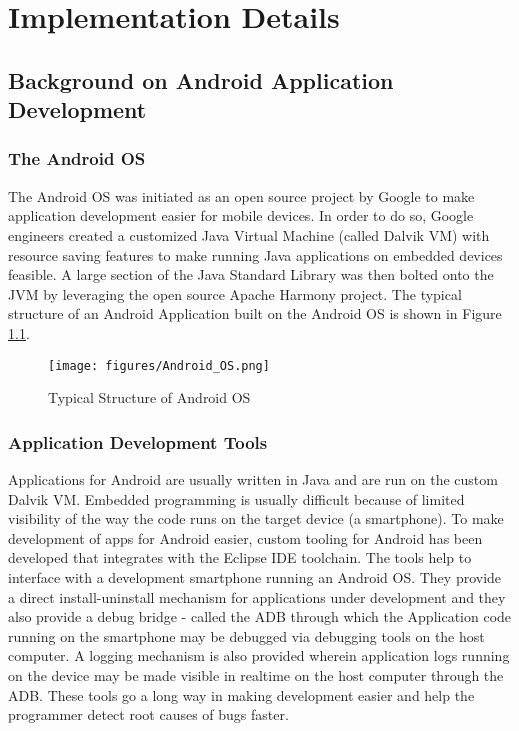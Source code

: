 \chapter{Implementation Details\label{chap:implementation_details}}

\section{Background on Android Application Development}

\subsection{The Android OS}

The Android OS was initiated as an open source project by Google  
to make application development easier for mobile devices. In order to 
do so, Google engineers created a customized Java Virtual Machine 
(called Dalvik VM) with resource saving features 
to make running Java applications on embedded devices feasible.
A large section of the Java Standard Library was then bolted onto the 
JVM by leveraging the open source Apache Harmony project. 
The typical structure of an Android Application built on the Android OS 
is shown in Figure \ref{fig:Android_OS_Structure}.

\begin{figure}
\centering
\texttt{[image: figures/Android\_OS.png]}
\caption{Typical Structure of Android OS\label{fig:Android_OS_Structure}}
\end{figure}

\subsection{Application Development Tools}

Applications for Android are usually written in Java and are run on the 
custom Dalvik VM. Embedded programming is usually difficult because of 
limited visibility of the way the code runs on the target device (a smartphone).
To make development of apps for Android easier, custom tooling for Android 
has been developed that integrates with the Eclipse IDE toolchain.
The tools help to
interface with a development smartphone running an Android OS. They provide a
direct install-uninstall mechanism for applications under development 
and they also provide a debug bridge - called the ADB through which 
the Application code running on the smartphone may be debugged via debugging
tools on the host computer. A logging mechanism is also provided wherein 
application logs running on the device may be made visible in realtime 
on the host computer through the ADB. These tools go a long way in making 
development easier and help the programmer detect root causes of bugs faster.


